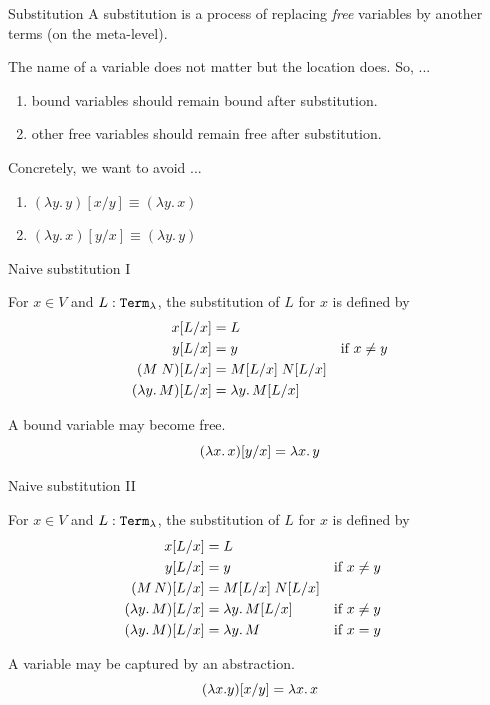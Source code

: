 \begin{frame}{Substitution}
   A \alert{substitution} is a process of replacing \emph{free} variables by
   another terms (on the meta-level). 

   The name of a variable does not matter but the location does. So, ...
   \begin{enumerate}
     \item bound variables should remain bound after substitution.
     \item other free variables should remain free after substitution.
   \end{enumerate}

   Concretely, we want to avoid ...
  \begin{enumerate}
    \item $(\lambda y.\,y)[x/y] \equiv (\lambda y.\, x)$
    \item $(\lambda y.\, x)[y/x] \equiv (\lambda y.\, y)$ 
  \end{enumerate}
   
  
\end{frame}
  
\begin{frame}{Naive substitution I}
  \begin{definition}
    For $x \in V$ and $L : \mathtt{Term}_\lambda$, the substitution of $L$ for $x$ is
    defined by
    \begin{align*}
      x[{L}/{x}] & = L \\
      y[{L}/{x}] & = y & \text{if $x \neq y$} \\
      (M\;N)[{L}/{x}]& = M[{L}/{x}] \; N[{L}/{x}] \\
      (\lambda y.\, M)[{L}/{x}] & = \lambda y.\, M [{L}/{x}]
    \end{align*}
  \end{definition}
    A bound variable may become free. 
    \[
      (\lambda x.\, x)[{y}/{x}] = \lambda x.\, y
    \]
\end{frame}
\begin{frame}{Naive substitution II}
  \begin{definition}
    For $x \in V$ and $L : \mathtt{Term}_\lambda$, the substitution
    of $L$ for $x$ is defined by
    \begin{align*}
      x[{L}/{x}] & = L \\
      y[{L}/{x}] & = y && \text{if $x \neq y$} \\
      (M\,N)[{L}/{x}] & = M[{L}/{x}]\; N[{L}/{x}] \\
      (\lambda y.\, M)[{L}/{x}] & = \lambda y.\, M[{L}/{x}] && \text{if $x \neq y$} \\
      (\lambda y.\, M)[{L}/{x}] & = \lambda y.\, M && \text{if $x = y$} 
    \end{align*}
  \end{definition}
    A variable may be captured by an abstraction. 
    \[
      (\lambda x. y)[{x}/{y}] = \lambda x.\, x
    \]
\end{frame}


